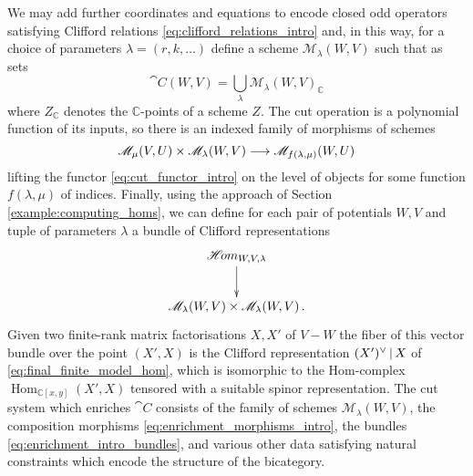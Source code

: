 \documentclass[english,letter paper,12pt,leqno]{article}
\theoremstyle{example}
\numberwithin{equation}{section}
\def\LG{\mathcal{LG}}
\def\Hom{\operatorname{Hom}}
\def\be{\begin{equation}}
\def\ee{\end{equation}}
\def\nC{\mathds{C}}
\def\L{\mathcal{C}}
\begin{document}
We may add further coordinates and equations to encode closed odd operators satisfying Clifford relations \eqref{eq:clifford_relations_intro} and, in this way, for a choice of parameters $\lambda = (r, k, \ldots)$ define a scheme $\mathscr{M}_{\lambda}(W,V)$ such that as sets
\begin{equation}\label{eq:param_frmf}
\cat{C}(W,V) = \bigcup_{\lambda} \mathscr{M}_{\lambda}(W,V)_{\nC}
\end{equation}
where $Z_{\nC}$ denotes the $\nC$-points of a scheme $Z$. The cut operation is a polynomial function of its inputs, so there is an indexed family of morphisms of schemes
\be\label{eq:enrichment_morphisms_intro}
\mathscr{M}_\mu(V,U) \times \mathscr{M}_\lambda(W,V) \lto \mathscr{M}_{f(\lambda, \mu)}(W, U)
\ee
lifting the functor \eqref{eq:cut_functor_intro} on the level of objects for some function $f(\lambda, \mu)$ of indices. Finally, using the approach of Section \ref{example:computing_homs}, we can define for each pair of potentials $W,V$ and tuple of parameters $\lambda$ a bundle of Clifford representations
\be\label{eq:enrichment_intro_bundles}
\xymatrix{
\mathscr{H}\! om_{W,V,\lambda} \ar[d]\\
\mathscr{M}_\lambda(W,V) \times \mathscr{M}_\lambda(W,V)\,.
}
\ee
Given two finite-rank matrix factorisations $X,X'$ of $V - W$ the fiber of this vector bundle over the point $(X',X)$ is the Clifford representation $(X')^{\vee} \,|\, X$ of \eqref{eq:final_finite_model_hom}, which is isomorphic to the Hom-complex $\Hom_{\nC[x,y]}(X',X)$ tensored with a suitable spinor representation. The cut system which enriches $\cat{C}$ consists of the family of schemes $\mathscr{M}_\lambda(W,V)$, the composition morphisms \eqref{eq:enrichment_morphisms_intro}, the bundles \eqref{eq:enrichment_intro_bundles}, and various other data satisfying natural constraints which encode the structure of the bicategory.




\end{document}
